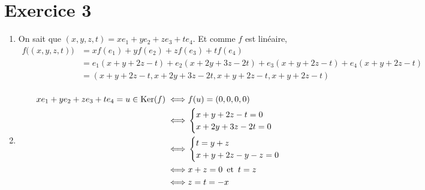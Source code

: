\part{Exercice 3}

\begin{enumerate}
	\item On sait que $(x,y,z,t) = xe_1 + ye_2 + ze_3 + te_4$. Et comme $f$ est linéaire,
		\begin{align*}
			f\big((x,y,z,t)\big) &= xf(e_1) + yf(e_2) + zf(e_3) + tf(e_4)\\
			&= e_1(x+y+2z-t) + e_2(x + 2y + 3z - 2t) + e_3(x+y+2z-t) + e_4(x+y+2z-t)\\
			&= (x+y+2z-t, x+2y+3z-2t, x+y+2z-t, x+y+2z-t) \\
		\end{align*}
	\item
		\begin{align*}
			xe_1 + ye_2 + ze_3 + te_4 = u \in \operatorname{Ker}(f) \iff& f(u) = (0,0,0,0)\\
			\iff& \begin{cases}
				x+y+2z-t = 0\\
				x+2y+3z-2t = 0
			\end{cases}\\
			\iff&\begin{cases}
				t = y + z\\
				x + y + 2z - y - z = 0\\
			\end{cases}\\
			\iff& x + z = 0 \operatorname{\text{ et }} t = z\\
			\iff& z = t = -x
		\end{align*}
\end{enumerate}
